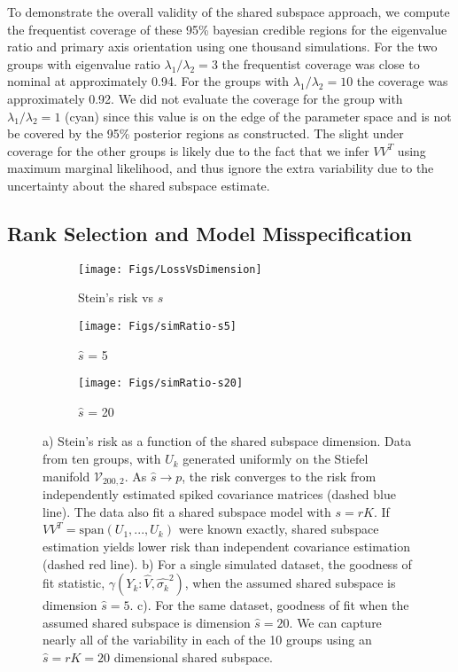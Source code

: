 \documentclass[12pt]{article}
\begin{document}
To demonstrate the overall validity of the shared subspace approach,
we compute the frequentist coverage of these 95\% bayesian credible
regions for the eigenvalue ratio and primary axis orientation using
one thousand simulations.  For the two groups with eigenvalue ratio
$\lambda_1/\lambda_2 = 3$ the frequentist coverage was close to
nominal at approximately 0.94.  For the groups with
$\lambda_1/\lambda_2 = 10$ the coverage was approximately 0.92.  We
did not evaluate the coverage for the group with
$\lambda_1/\lambda_2 = 1$ (cyan) since this value is on the edge of the
parameter space and is not be covered by the 95\% posterior regions
as constructed.  The slight under coverage for the other groups is likely due to the fact
that we infer $VV^T$ using maximum marginal likelihood, and thus
ignore the extra variability due to the uncertainty about the shared
subspace estimate.

\subsection{Rank Selection and Model Misspecification}

\begin{figure}[t]
    \centering
    \begin{subfigure}[b]{0.3\textwidth}
        \texttt{[image: Figs/LossVsDimension]}
        \caption{Stein's risk vs $\hat{s}$}
        \label{fig:sdimension}
    \end{subfigure}
    \begin{subfigure}[b]{0.3\textwidth}
        \texttt{[image: Figs/simRatio-s5]}
        \caption{$\hat{s}$ = 5}
        \label{fig:ratio-s5}
    \end{subfigure}
    \begin{subfigure}[b]{0.3\textwidth}
        \texttt{[image: Figs/simRatio-s20]}
        \caption{$\hat{s}$ = 20}
        \label{fig:ratio-s20}
    \end{subfigure}
    \caption{a) Stein's risk as a function of the
      shared subspace dimension.  Data from ten groups, with $U_k$
      generated uniformly on the Stiefel manifold
      $\mathcal{V}_{200, 2}$.  As $\hat{s} \rightarrow p$, the risk converges to the
      risk from independently estimated spiked covariance matrices
      (dashed blue line).  The data also fit a shared subspace model
      with $s=rK$.  If $VV^T = \text{span}(U_1, ..., U_k)$ were known
      exactly, shared subspace estimation yields lower risk than
      independent covariance estimation (dashed red line).  b) For a
      single simulated dataset, the goodness of fit statistic,
      $\gamma(Y_k: \hat{V}, \hat{\sigma_k}^2)$, when the assumed
      shared subspace is dimension $\hat{s} = 5$.  c).  For the same
      dataset, goodness of fit when the assumed shared subspace is
      dimension $\hat{s} = 20$.  We can capture nearly all of the
      variability in each of the 10 groups using an $\hat{s}=rK=20$
      dimensional shared subspace. }
\label{fig:dimensionPlots}
\end{figure}
\end{document}
